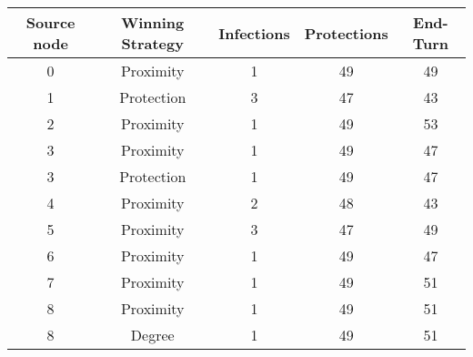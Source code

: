 \documentclass[results.tex]{subfiles}
\begin{document}
    \begin{center}
        \begin{tabular}{| c || c | c | c | c |}
            \hline
            {\bfseries Source node} & {\bfseries Winning Strategy} & {\bfseries Infections} & {\bfseries Protections}
            & {\bfseries End-Turn}
            \\  %
            \hline\hline
            0                       & Proximity                    & 1                      & 49                      & 49                   \\
            \hline
            1                       & Protection                   & 3                      & 47                      & 43                   \\
            \hline
            2                       & Proximity                    & 1                      & 49                      & 53                   \\
            \hline
            3                       & Proximity                    & 1                      & 49                      & 47                   \\
            \hline
            3                       & Protection                   & 1                      & 49                      & 47                   \\
            \hline
            4                       & Proximity                    & 2                      & 48                      & 43                   \\
            \hline
            5                       & Proximity                    & 3                      & 47                      & 49                   \\
            \hline
            6                       & Proximity                    & 1                      & 49                      & 47                   \\
            \hline
            7                       & Proximity                    & 1                      & 49                      & 51                   \\
            \hline
            8                       & Proximity                    & 1                      & 49                      & 51                   \\
            \hline
            8                       & Degree                       & 1                      & 49                      & 51                   \\

\end{tabular}
\end{center}
\end{document}
